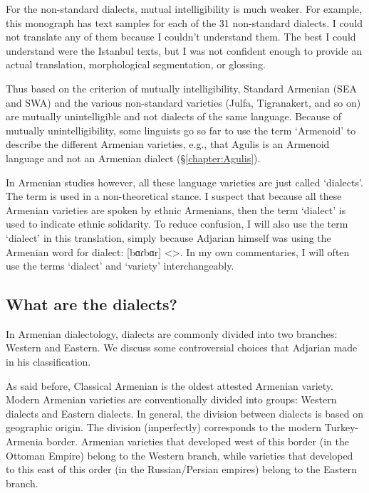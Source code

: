 For the non-standard dialects, mutual intelligibility is much weaker. For example, this monograph has text samples for each of the 31 non-standard dialects. I could not translate any of them because I couldn't understand them. The best I could understand were the Istanbul texts, but I was not confident enough to provide an actual translation, morphological segmentation, or glossing. 


Thus based on the criterion of mutually intelligibility, Standard Armenian (SEA and SWA) and the various non-standard varieties (Julfa, Tigranakert, and so on) are mutually unintelligible and not dialects of the same language. Because of mutually unintelligibility, some linguists go so far to use the term `Armenoid' to describe the different Armenian varieties, e.g., that Agulis is an Armenoid language \citep{Vaux-2008-ArmenianZok} and not an Armenian dialect (\S\ref{chapter:Agulis}). 

In Armenian studies however, all these language varieties are just called `dialects'. The term is used in a non-theoretical stance. I suspect that because all these Armenian varieties are spoken by ethnic Armenians, then the term `dialect' is used to indicate ethnic solidarity. To reduce confusion, I will also use the term `dialect' in this translation, simply because Adjarian himself was using the Armenian word for dialect: [bɑɾbɑr] <>. In my own commentaries, I will often use the terms `dialect' and `variety' interchangeably. 





\subsection{What are the dialects?}\label{sec:HossepIntro:armenian:whataredialect}

In Armenian dialectology, dialects are commonly divided into two branches: Western and Eastern. We discuss some controversial choices that Adjarian made in his classification. 


As said before, Classical Armenian is the oldest attested Armenian variety. Modern Armenian varieties are conventionally divided into groups: Western dialects and Eastern dialects. In general, the division between dialects is based on geographic origin. The division (imperfectly) corresponds to the modern Turkey-Armenia border. Armenian varieties that developed west of this border (in the Ottoman Empire) belong to the Western branch, while varieties that developed to this east of this order (in the Russian/Persian empires) belong to the Eastern branch. 

